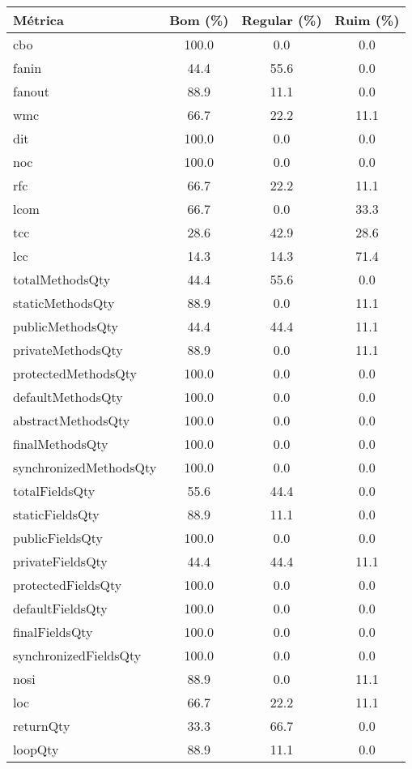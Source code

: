 \begin{tabular}{lccc}
                \toprule
                \textbf{Métrica} & \textbf{Bom (\%)} & \textbf{Regular (\%)} & \textbf{Ruim (\%)} \\
                \midrule
                cbo & 100.0 & 0.0 & 0.0 \\
fanin & 44.4 & 55.6 & 0.0 \\
fanout & 88.9 & 11.1 & 0.0 \\
wmc & 66.7 & 22.2 & 11.1 \\
dit & 100.0 & 0.0 & 0.0 \\
noc & 100.0 & 0.0 & 0.0 \\
rfc & 66.7 & 22.2 & 11.1 \\
lcom & 66.7 & 0.0 & 33.3 \\
tcc & 28.6 & 42.9 & 28.6 \\
lcc & 14.3 & 14.3 & 71.4 \\
totalMethodsQty & 44.4 & 55.6 & 0.0 \\
staticMethodsQty & 88.9 & 0.0 & 11.1 \\
publicMethodsQty & 44.4 & 44.4 & 11.1 \\
privateMethodsQty & 88.9 & 0.0 & 11.1 \\
protectedMethodsQty & 100.0 & 0.0 & 0.0 \\
defaultMethodsQty & 100.0 & 0.0 & 0.0 \\
abstractMethodsQty & 100.0 & 0.0 & 0.0 \\
finalMethodsQty & 100.0 & 0.0 & 0.0 \\
synchronizedMethodsQty & 100.0 & 0.0 & 0.0 \\
totalFieldsQty & 55.6 & 44.4 & 0.0 \\
staticFieldsQty & 88.9 & 11.1 & 0.0 \\
publicFieldsQty & 100.0 & 0.0 & 0.0 \\
privateFieldsQty & 44.4 & 44.4 & 11.1 \\
protectedFieldsQty & 100.0 & 0.0 & 0.0 \\
defaultFieldsQty & 100.0 & 0.0 & 0.0 \\
finalFieldsQty & 100.0 & 0.0 & 0.0 \\
synchronizedFieldsQty & 100.0 & 0.0 & 0.0 \\
nosi & 88.9 & 0.0 & 11.1 \\
loc & 66.7 & 22.2 & 11.1 \\
returnQty & 33.3 & 66.7 & 0.0 \\
loopQty & 88.9 & 11.1 & 0.0 \\

\end{tabular}
